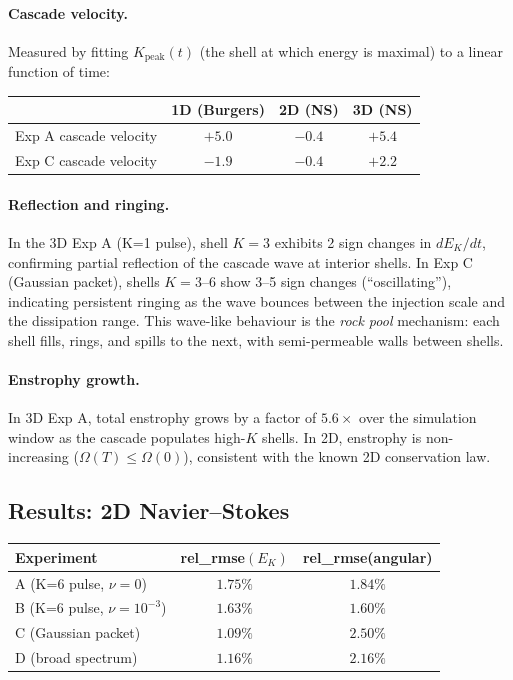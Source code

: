 \documentclass[11pt,a4paper]{article}
\theoremstyle{remark}
\begin{document}
\paragraph{Cascade velocity.}  Measured by fitting $K_{\mathrm{peak}}(t)$ (the shell at which energy is maximal) to a linear function of time:
\begin{center}
\begin{tabular}{lccc}
\toprule
& 1D (Burgers) & 2D (NS) & 3D (NS) \\
\midrule
Exp A cascade velocity & $+5.0$ & $-0.4$\footnotemark & $+5.4$ \\
Exp C cascade velocity & $-1.9$ & $-0.4$ & $+2.2$ \\
\bottomrule
\end{tabular}
\end{center}

\paragraph{Reflection and ringing.}  In the 3D Exp A (K=1 pulse), shell $K=3$ exhibits 2 sign changes in $dE_K/dt$, confirming partial reflection of the cascade wave at interior shells.  In Exp C (Gaussian packet), shells $K=3$--$6$ show 3--5 sign changes (``oscillating''), indicating persistent ringing as the wave bounces between the injection scale and the dissipation range.  This wave-like behaviour is the \emph{rock pool} mechanism: each shell fills, rings, and spills to the next, with semi-permeable walls between shells.

\paragraph{Enstrophy growth.}  In 3D Exp A, total enstrophy grows by a factor of $5.6\times$ over the simulation window as the cascade populates high-$K$ shells.  In 2D, enstrophy is non-increasing ($\Omega(T) \leq \Omega(0)$), consistent with the known 2D conservation law.

\subsection{Results: 2D Navier--Stokes}

\begin{center}
\begin{tabular}{lcc}
\toprule
Experiment & rel\_rmse$(E_K)$ & rel\_rmse(angular) \\
\midrule
A (K=6 pulse, $\nu=0$)     & $1.75\%$ & $1.84\%$ \\
B (K=6 pulse, $\nu=10^{-3}$) & $1.63\%$ & $1.60\%$ \\
C (Gaussian packet)           & $1.09\%$ & $2.50\%$ \\
D (broad spectrum)            & $1.16\%$ & $2.16\%$ \\
\bottomrule
\end{tabular}
\end{center}
\end{document}
